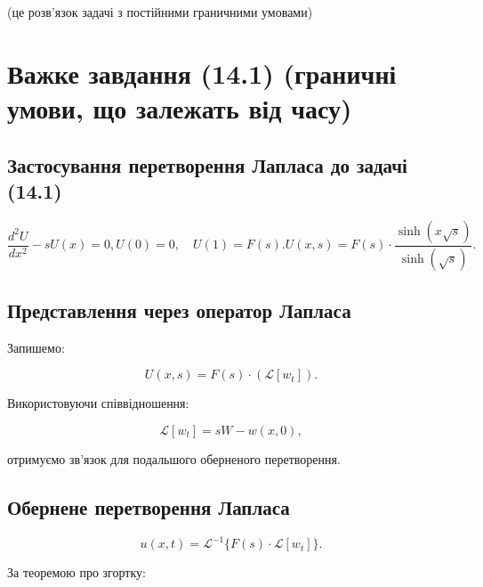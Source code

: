 \documentclass[
  ukrainian,
]{article}
\begin{document}
(це розв'язок задачі з постійними граничними умовами)

\section{Важке завдання (14.1) (граничні умови, що залежать від
часу)}\label{ux432ux430ux436ux43aux435-ux437ux430ux432ux434ux430ux43dux43dux44f-14.1-ux433ux440ux430ux43dux438ux447ux43dux456-ux443ux43cux43eux432ux438-ux449ux43e-ux437ux430ux43bux435ux436ux430ux442ux44c-ux432ux456ux434-ux447ux430ux441ux443}

\subsection{Застосування перетворення Лапласа до задачі
(14.1)}\label{ux437ux430ux441ux442ux43eux441ux443ux432ux430ux43dux43dux44f-ux43fux435ux440ux435ux442ux432ux43eux440ux435ux43dux43dux44f-ux43bux430ux43fux43bux430ux441ux430-ux434ux43e-ux437ux430ux434ux430ux447ux456-14.1}

\[
\frac{d^2 U}{dx^2} - s U(x) = 0,
U(0) = 0, \quad U(1) = F(s).
U(x, s) = F(s)\cdot \frac{\sinh(x \sqrt{s})}{\sinh(\sqrt{s})}.
\]

\subsection{Представлення через оператор
Лапласа}\label{ux43fux440ux435ux434ux441ux442ux430ux432ux43bux435ux43dux43dux44f-ux447ux435ux440ux435ux437-ux43eux43fux435ux440ux430ux442ux43eux440-ux43bux430ux43fux43bux430ux441ux430}

Запишемо:

\[
U(x, s) = F(s) \cdot \left( \mathcal{L}[w_t] \right).
\]

Використовуючи співвідношення:

\[
\mathcal{L}[w_t] = s W - w(x, 0),
\]

отримуємо зв'язок для подальшого оберненого перетворення.

\subsection{Обернене перетворення
Лапласа}\label{ux43eux431ux435ux440ux43dux435ux43dux435-ux43fux435ux440ux435ux442ux432ux43eux440ux435ux43dux43dux44f-ux43bux430ux43fux43bux430ux441ux430}

\[
u(x, t) = \mathcal{L}^{-1}\{F(s)\cdot \mathcal{L}[w_t]\}.
\]

За теоремою про згортку:
\end{document}
